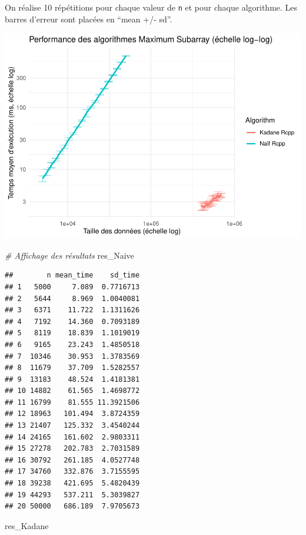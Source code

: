 \documentclass[
]{article}
\newenvironment{Shaded}{\begin{snugshade}}{\end{snugshade}}
\newcommand{\CommentTok}[1]{\textcolor[rgb]{0.56,0.35,0.01}{\textit{#1}}}
\newcommand{\NormalTok}[1]{#1}
\begin{document}
On réalise 10 répétitions pour chaque valeur de \texttt{n} et pour
chaque algorithme. Les barres d'erreur sont placées en ``mean +/- sd''.

\includegraphics{MaxSubarray1D_files/figure-latex/simu complexite-1.pdf}

\begin{Shaded}
\begin{Highlighting}[]
\CommentTok{\# Affichage des résultats}
\NormalTok{res\_Naive}
\end{Highlighting}
\end{Shaded}

\begin{verbatim}
##        n mean_time    sd_time
## 1   5000     7.089  0.7716713
## 2   5644     8.969  1.0040081
## 3   6371    11.722  1.1311626
## 4   7192    14.360  0.7093189
## 5   8119    18.839  1.1019019
## 6   9165    23.243  1.4850518
## 7  10346    30.953  1.3783569
## 8  11679    37.709  1.5282557
## 9  13183    48.524  1.4181381
## 10 14882    61.565  1.4698772
## 11 16799    81.555 11.3921506
## 12 18963   101.494  3.8724359
## 13 21407   125.332  3.4540244
## 14 24165   161.602  2.9803311
## 15 27278   202.783  2.7031589
## 16 30792   261.185  4.0527748
## 17 34760   332.876  3.7155595
## 18 39238   421.695  5.4820439
## 19 44293   537.211  5.3039827
## 20 50000   686.189  7.9705673
\end{verbatim}

\begin{Shaded}
\begin{Highlighting}[]
\NormalTok{res\_Kadane}
\end{Highlighting}
\end{Shaded}
\end{document}
